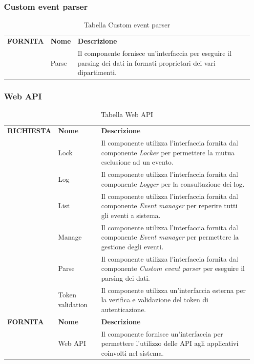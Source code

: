 \documentclass{article}
\begin{document}
\subsubsection{Custom event parser}

\begin{table}[htbp]
    \centering
    \renewcommand{\arraystretch}{1.3} %
    \begin{tabularx}{\textwidth}{| l | l | X |}
        \Xhline{2pt}
        \textbf{FORNITA} & \textbf{Nome} & \textbf{Descrizione} \\
        \Xhline{2pt}
         & Parse & Il componente fornisce un'interfaccia per eseguire il parsing dei dati in formati proprietari dei vari dipartimenti. \\
        \hline
    \end{tabularx}
    \caption{Tabella Custom event parser}
\end{table}

\clearpage

\subsubsection{Web API}

\begin{table}[htbp]
    \centering
    \renewcommand{\arraystretch}{1.3} %
    \begin{tabularx}{\textwidth}{| l | l | X |}
        \Xhline{2pt}
        \textbf{RICHIESTA} & \textbf{Nome} & \textbf{Descrizione} \\
        \Xhline{2pt}
         & Lock & Il componente utilizza l'interfaccia fornita dal componente \textit{Locker} per permettere la mutua esclusione ad un evento. \\
        \hline
         & Log & Il componente utilizza l'interfaccia fornita dal componente \textit{Logger} per la consultazione dei log. \\
        \hline
         & List & Il componente utilizza l'interfaccia fornita dal componente \textit{Event manager} per reperire tutti gli eventi a sistema. \\
        \hline
         & Manage & Il componente utilizza l'interfaccia fornita dal componente \textit{Event manager} per permettere la gestione degli eventi. \\
        \hline
         & Parse & Il componente utilizza l'interfaccia fornita dal componente \textit{Custom event parser} per eseguire il parsing dei dati. \\
        \hline
         & Token validation & Il componente utilizza un'interfaccia esterna per la verifica e validazione del token di autenticazione. \\
         \textbf{FORNITA} & \textbf{Nome} & \textbf{Descrizione} \\
        \Xhline{2pt}
         & Web API & Il componente fornisce un'interfaccia per permettere l'utilizzo delle API agli applicativi coinvolti nel sistema. \\
        \hline
    \end{tabularx}
    \caption{Tabella Web API}
\end{table}
\end{document}
